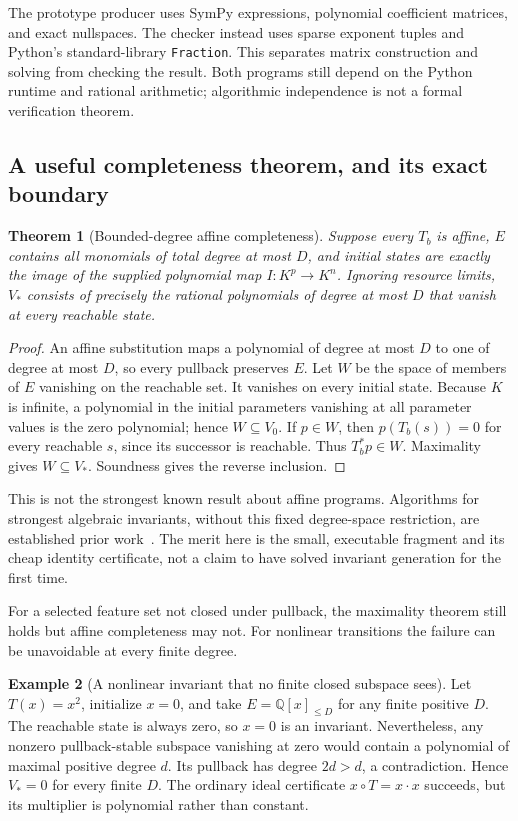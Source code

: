 \documentclass[11pt,letterpaper]{article}
\newcommand{\Q}{\mathbb Q}\newcommand{\R}{\mathbb R}\newcommand{\N}{\mathbb N}
\newcommand{\code}[1]{\texttt{#1}}
\newtheorem{theorem}{Theorem}[section]
\theoremstyle{definition}\newtheorem{definition}[theorem]{Definition}
\newtheorem{example}[theorem]{Example}
\theoremstyle{remark}\newtheorem{remark}[theorem]{Remark}
\begin{document}
The prototype producer uses SymPy expressions, polynomial coefficient matrices,
and exact nullspaces. The checker instead uses sparse exponent tuples and
Python's standard-library \code{Fraction}. This separates matrix construction
and solving from checking the result. Both programs still depend on the Python
runtime and rational arithmetic; algorithmic independence is not a formal
verification theorem.

\subsection{A useful completeness theorem, and its exact boundary}
\begin{theorem}[Bounded-degree affine completeness]
\label{thm:affinecomplete}
Suppose every $T_b$ is affine, $E$ contains all monomials of total degree at most
$D$, and initial states are exactly the image of the supplied polynomial map
$I:K^p\to K^n$. Ignoring resource limits, $V_*$ consists of precisely the
rational polynomials of degree at most $D$ that vanish at every reachable
state.
\end{theorem}
\begin{proof}
An affine substitution maps a polynomial of degree at most $D$ to one of degree
at most $D$, so every pullback preserves $E$. Let $W$ be the space of members
of $E$ vanishing on the reachable set. It vanishes on every initial state.
Because $K$ is infinite, a polynomial in the initial parameters vanishing at all
parameter values is the zero polynomial; hence $W\subseteq V_0$.
If $p\in W$, then $p(T_b(s))=0$ for every reachable $s$, since its successor is
reachable. Thus $T_b^*p\in W$. Maximality gives $W\subseteq V_*$. Soundness
gives the reverse inclusion.
\end{proof}

This is not the strongest known result about affine programs. Algorithms for
strongest algebraic invariants, without this fixed degree-space restriction,
are established prior work~\cite{affine-invariants}. The merit here is the
small, executable fragment and its cheap identity certificate, not a claim to
have solved invariant generation for the first time.

For a selected feature set not closed under pullback, the maximality theorem
still holds but affine completeness may not. For nonlinear transitions the
failure can be unavoidable at every finite degree.

\begin{example}[A nonlinear invariant that no finite closed subspace sees]
Let $T(x)=x^2$, initialize $x=0$, and take $E=\Q[x]_{\le D}$ for any finite
positive $D$. The reachable state is always zero, so $x=0$ is an invariant.
Nevertheless, any nonzero pullback-stable subspace vanishing at zero would
contain a polynomial of maximal positive degree $d$. Its pullback has degree
$2d>d$, a contradiction. Hence $V_*=0$ for every finite $D$.
The ordinary ideal certificate $x\circ T=x\cdot x$ succeeds, but its multiplier
is polynomial rather than constant.
\end{example}
\end{document}
